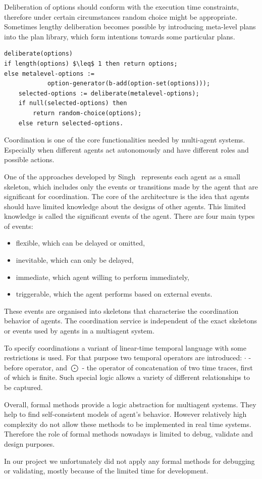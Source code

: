 Deliberation of options should conform with the execution time constraints, therefore under certain circumstances random choice might be appropriate.
Sometimes lengthy deliberation becomes possible by introducing meta-level plans into the plan library, which form intentions towards some particular plans.

\begin{lstlisting}[mathescape]
deliberate(options)
if length(options) $\leq$ 1 then return options;
else metalevel-options :=
            option-generator(b-add(option-set(options)));
    selected-options := deliberate(metalevel-options);
    if null(selected-options) then
        return random-choice(options);
    else return selected-options.
\end{lstlisting}

Coordination is one of the core functionalities needed by multi-agent systems.
Especially when different agents act autonomously and have different roles and possible actions.

One of the approaches developed by Singh~\cite{Singh_97} represents each agent as a small skeleton, which includes only the events or transitions made by the agent that are significant for coordination.
The core of the architecture is the idea that agents should have limited knowledge about the designs of other agents.
This limited knowledge is called the significant events of the agent.
There are four main types of events:
\begin{itemize}
  \item flexible, which can be delayed or omitted,
  \item inevitable, which can only be delayed,
  \item immediate, which agent willing to perform immediately,
  \item triggerable, which the agent performs based on external events.
\end{itemize}
These events are organised into skeletons that characterise the coordination behavior of agents. The coordination service is independent of the exact skeletons or events used by agents in a multiagent system.

To specify coordinations a variant of linear-time temporal language with some restrictions is used. For that purpose two temporal operators are introduced: $\cdot$ - before operator, and $\bigodot$ - the operator of concatenation of two time traces, first of which is finite. Such special logic allows a variety of different relationships to be captured.

Overall, formal methods provide a logic abstraction for multiagent systems. They help to find self-consistent models of agent's behavior. However relatively high complexity do not allow these methods to be implemented in real time systems. Therefore the role of formal methods nowadays is limited to debug, validate and design purposes.

In our project we unfortunately did not apply any formal methods for debugging or validating, mostly because of the limited time for development.

